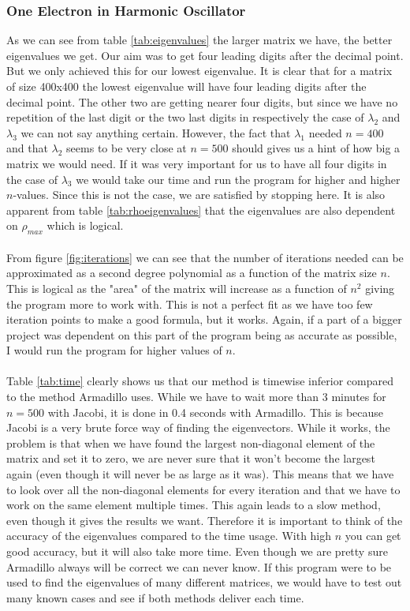 \documentclass{article}
\begin{document}
\subsubsection{One Electron in Harmonic Oscillator}
As we can see from table \ref{tab:eigenvalues} the larger matrix we have, the better eigenvalues we get. Our aim was to get four leading digits after the decimal point. But we only achieved this for our lowest eigenvalue. It is clear that for a matrix of size 400x400 the lowest eigenvalue will have four leading digits after the decimal point. The other two are getting nearer four digits, but since we have no repetition of the last digit or the two last digits in respectively the case of $\lambda_2$ and $\lambda_3$ we can not say anything certain. However, the fact that $\lambda_1$ needed $n=400$ and that $\lambda_2$ seems to be very close at $n=500$ should gives us a hint of how big a matrix we would need. If it was very important for us to have all four digits in the case of $\lambda_3$ we would take our time and run the program for higher and higher $n$-values. Since this is not the case, we are satisfied by stopping here.
It is also apparent from table \ref{tab:rhoeigenvalues} that the eigenvalues are also dependent on $\rho_{max}$ which is logical.\\ \\
From figure \ref{fig:iterations} we can see that the number of iterations needed can be approximated as a second degree polynomial as a function of the matrix size $n$. This is logical as the "area" of the matrix will increase as a function of $n^2$ giving the program more to work with. This is not a perfect fit as we have too few iteration points to make a good formula, but it works. Again, if a part of a bigger project was dependent on this part of the program being as accurate as possible, I would run the program for higher values of $n$. \\ \\
Table \ref{tab:time} clearly shows us that our method is timewise inferior compared to the method Armadillo uses. While we have to wait more than 3 minutes for $n = 500$ with Jacobi, it is done in 0.4 seconds with Armadillo. This is because Jacobi is a very brute force way of finding the eigenvectors. While it works, the problem is that when we have found the largest non-diagonal element of the matrix and set it to zero, we are never sure that it won't become the largest again (even though it will never be as large as it was). This means that we have to look over all the non-diagonal elements for every iteration and that we have to work on the same element multiple times. This again leads to a slow method, even though it gives the results we want. Therefore it is important to think of the accuracy of the eigenvalues compared to the time usage. With high $n$ you can get good accuracy, but it will also take more time. Even though we are pretty sure Armadillo always will be correct we can never know. If this program were to be used to find the eigenvalues of many different matrices, we would have to test out many known cases and see if both methods deliver each time.
\end{document}
